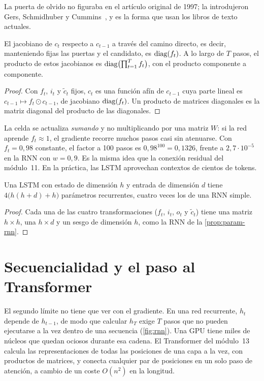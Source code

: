 La puerta de olvido no figuraba en el artículo original de 1997; la introdujeron Gers, Schmidhuber y Cummins~\cite{gers}, y es la forma que usan los libros de texto actuales.

\begin{proposicion}\label{prop:lstm-grad}
El jacobiano de $c_t$ respecto a $c_{t-1}$ a través del camino directo, es decir, manteniendo fijas las puertas y el candidato, es $\operatorname{diag}(f_t)$. A lo largo de $T$ pasos, el producto de estos jacobianos es $\operatorname{diag}\bigl(\prod_{t=1}^{T}f_t\bigr)$, con el producto componente a componente.
\end{proposicion}

\begin{proof}
Con $f_t$, $i_t$ y $\tilde c_t$ fijos, $c_t$ es una función afín de $c_{t-1}$ cuya parte lineal es $c_{t-1}\mapsto f_t\odot c_{t-1}$, de jacobiano $\operatorname{diag}(f_t)$. Un producto de matrices diagonales es la matriz diagonal del producto de las diagonales.
\end{proof}

La celda se actualiza \emph{sumando} y no multiplicando por una matriz $W$: si la red aprende $f_t\approx 1$, el gradiente recorre muchos pasos casi sin atenuarse. Con $f_t=0{,}98$ constante, el factor a 100 pasos es $0{,}98^{100}=0{,}1326$, frente a $2{,}7\cdot 10^{-5}$ en la RNN con $w=0{,}9$. Es la misma idea que la conexión residual del módulo~11. En la práctica, las LSTM aprovechan contextos de cientos de tokens.

\begin{corolario}\label{cor:param-lstm}
Una LSTM con estado de dimensión $h$ y entrada de dimensión $d$ tiene $4\bigl(h(h+d)+h\bigr)$ parámetros recurrentes, cuatro veces los de una RNN simple.
\end{corolario}

\begin{proof}
Cada una de las cuatro transformaciones ($f_t$, $i_t$, $o_t$ y $\tilde c_t$) tiene una matriz $h\times h$, una $h\times d$ y un sesgo de dimensión $h$, como la RNN de la \cref{prop:param-rnn}.
\end{proof}

\section{Secuencialidad y el paso al Transformer}

El segundo límite no tiene que ver con el gradiente. En una red recurrente, $h_t$ depende de $h_{t-1}$, de modo que calcular $h_T$ exige $T$ pasos que no pueden ejecutarse a la vez dentro de una secuencia (\cref{fig:rnn}). Una GPU tiene miles de núcleos que quedan ociosos durante esa cadena. El Transformer del módulo~13 calcula las representaciones de todas las posiciones de una capa a la vez, con productos de matrices, y conecta cualquier par de posiciones en un solo paso de atención, a cambio de un coste $O(n^{2})$ en la longitud.

